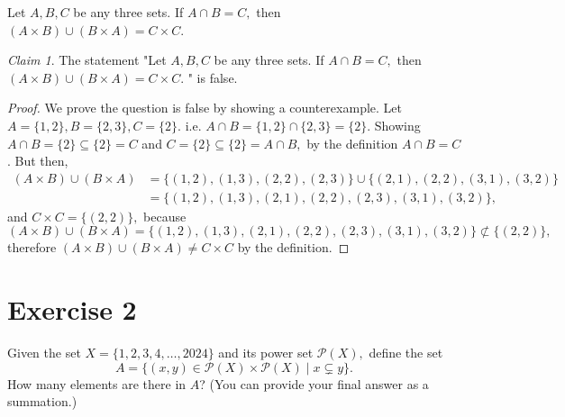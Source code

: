 \documentclass{homework}
\theoremstyle{remark}
\newtheorem*{claim}{Claim}
\newcommand{\?}{\stackrel{?}{=}}
\begin{document}
\question Let $A,B,C$ be any three sets. If $A\cap B=C,$ then $(A\times B)\cup(B\times A)=C\times C.$ 
\begin{claim}
The statement "Let $A,B,C$ be any three sets. If $A\cap B=C,$ then $(A\times B)\cup(B\times A)=C\times C.$ " is false. 
\end{claim}
\begin{proof}
    We prove the question is false by showing a counterexample. Let $A=\{1,2\}, B=\{2,3\}, C=\{2\}.$ i.e. $A\cap B=\{1,2\}\cap\{2,3\}=\{2\}.$ Showing $A\cap B=\{2\}\subseteq \{2\}=C$ and $C=\{2\}\subseteq \{2\}=A\cap B,$ by the definition $A\cap B = C$. But then,  
    \begin{align*}
    (A\times B)\cup(B\times A)&=\{(1,2),(1,3),(2,2),(2,3)\}\cup\{(2,1),(2,2),(3,1),(3,2)\}\\&=\{(1,2),(1,3),(2,1),(2,2),(2,3),(3,1),(3,2)\},
\end{align*}
and $C\times C=\{(2,2)\},$ because $$(A\times B)\cup(B\times A)=\{(1,2),(1,3),(2,1),(2,2),(2,3),(3,1),(3,2)\}\not\subset\{(2,2)\},$$ therefore $(A\times B)\cup(B\times A)\neq C\times C$ by the definition. 
\end{proof}




\newpage
\section*{Exercise 2}
\question Given the set $X=\{1,2,3,4,\ldots,2024\}$ and its power set $\mathcal{P}(X),$ define the set $$A=\{(x,y)\in\mathcal{P}(X)\times\mathcal{P}(X)\mid x\subsetneq y\}.$$ How many elements are there in $A$? (You can provide your final answer as a summation.) 
\end{document}
